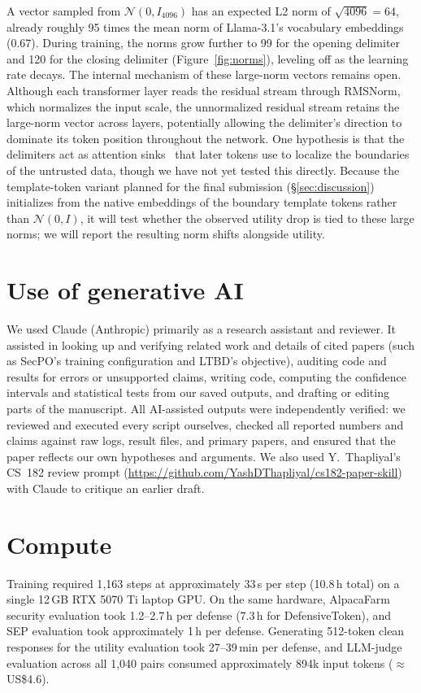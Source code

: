 \documentclass{article}
\begin{document}
A vector sampled from $\mathcal{N}(0, I_{4096})$ has an expected L2 norm of $\sqrt{4096} = 64$, already roughly 95 times the mean norm of Llama-3.1's vocabulary embeddings (0.67). During training, the norms grow further to 99 for the opening delimiter and 120 for the closing delimiter (Figure~\ref{fig:norms}), leveling off as the learning rate decays. The internal mechanism of these large-norm vectors remains open. Although each transformer layer reads the residual stream through RMSNorm, which normalizes the input scale, the unnormalized residual stream retains the large-norm vector across layers, potentially allowing the delimiter's direction to dominate its token position throughout the network. One hypothesis is that the delimiters act as attention sinks~\cite{xiao2024sinks} that later tokens use to localize the boundaries of the untrusted data, though we have not yet tested this directly. Because the template-token variant planned for the final submission (\S\ref{sec:discussion}) initializes from the native embeddings of the boundary template tokens rather than $\mathcal{N}(0, I)$, it will test whether the observed utility drop is tied to these large norms; we will report the resulting norm shifts alongside utility.

\section{Use of generative AI}
\label{app:ai}
We used Claude (Anthropic) primarily as a research assistant and reviewer. It assisted in looking up and verifying related work and details of cited papers (such as SecPO's training configuration and LTBD's objective), auditing code and results for errors or unsupported claims, writing code, computing the confidence intervals and statistical tests from our saved outputs, and drafting or editing parts of the manuscript. All AI-assisted outputs were independently verified: we reviewed and executed every script ourselves, checked all reported numbers and claims against raw logs, result files, and primary papers, and ensured that the paper reflects our own hypotheses and arguments. We also used Y.~Thapliyal's CS~182 review prompt (\url{https://github.com/YashDThapliyal/cs182-paper-skill}) with Claude to critique an earlier draft.

\section{Compute}
\label{app:compute}
Training required 1{,}163 steps at approximately 33\,s per step (10.8\,h total) on a single 12\,GB RTX 5070 Ti laptop GPU. On the same hardware, AlpacaFarm security evaluation took 1.2--2.7\,h per defense (7.3\,h for DefensiveToken), and SEP evaluation took approximately 1\,h per defense. Generating 512-token clean responses for the utility evaluation took 27--39\,min per defense, and LLM-judge evaluation across all 1{,}040 pairs consumed approximately 894k input tokens ($\approx$ US\$4.6).
\end{document}
